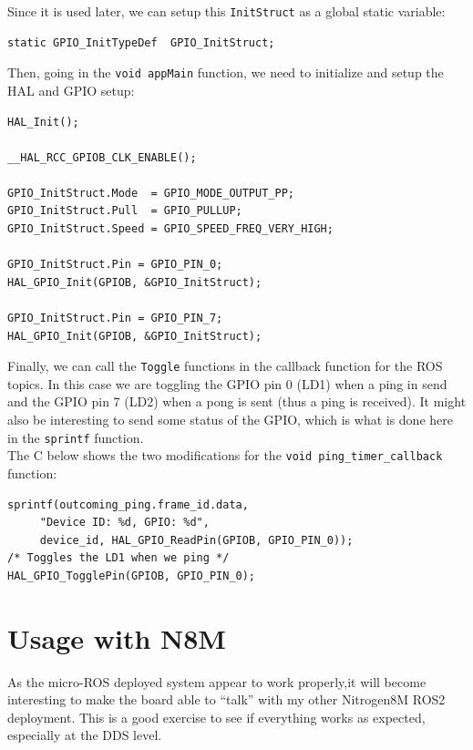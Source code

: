 \documentclass[10pt]{article}
\begin{document}
Since it is used later, we can setup this \verb|InitStruct| as a global static variable:
\begin{tcolorbox}
\begin{verbatim}
static GPIO_InitTypeDef  GPIO_InitStruct;
\end{verbatim}
\end{tcolorbox}

Then, going in the \verb|void appMain| function, we need to initialize and setup the HAL and GPIO setup:
\begin{tcolorbox}
\begin{verbatim}
HAL_Init();

__HAL_RCC_GPIOB_CLK_ENABLE();

GPIO_InitStruct.Mode  = GPIO_MODE_OUTPUT_PP;
GPIO_InitStruct.Pull  = GPIO_PULLUP;
GPIO_InitStruct.Speed = GPIO_SPEED_FREQ_VERY_HIGH;

GPIO_InitStruct.Pin = GPIO_PIN_0;
HAL_GPIO_Init(GPIOB, &GPIO_InitStruct);

GPIO_InitStruct.Pin = GPIO_PIN_7;
HAL_GPIO_Init(GPIOB, &GPIO_InitStruct);
\end{verbatim}
\end{tcolorbox}

Finally, we can call the \verb|Toggle| functions in the callback function for the ROS topics. In this case we are toggling the GPIO pin 0 (LD1) when a ping in send and the GPIO pin 7 (LD2) when a pong is sent (thus a ping is received).
It might also be interesting to send some status of the GPIO, which is what is done here in the \verb|sprintf| function.\\
The C below shows the two modifications for the \verb|void ping_timer_callback| function:
\begin{tcolorbox}
\begin{verbatim}
sprintf(outcoming_ping.frame_id.data,
     "Device ID: %d, GPIO: %d",
     device_id, HAL_GPIO_ReadPin(GPIOB, GPIO_PIN_0));
/* Toggles the LD1 when we ping */
HAL_GPIO_TogglePin(GPIOB, GPIO_PIN_0);
\end{verbatim}
\end{tcolorbox}


\pagebreak
\section{Usage with N8M}
\label{sec:usage-with-n8m}
As the micro-ROS deployed system appear to work properly,it will become interesting
to make the board able to ``talk'' with my other Nitrogen8M ROS2 deployment.
This is a good exercise to see if everything works as expected, especially at
the DDS level.
\end{document}
